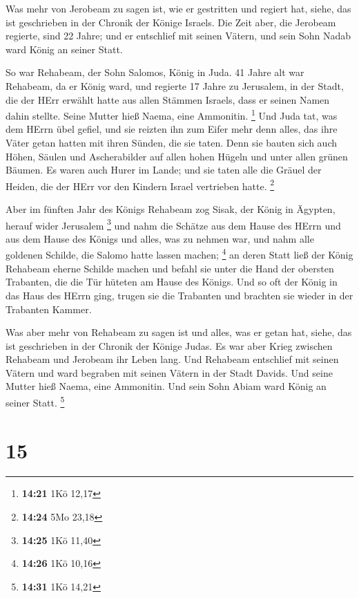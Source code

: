  Was mehr von Jerobeam zu sagen ist, wie er gestritten und
regiert hat, siehe, das ist geschrieben in der Chronik der Könige
Israels.  Die Zeit aber, die Jerobeam regierte, sind 22
Jahre; und er entschlief mit seinen Vätern, und sein Sohn Nadab ward
König an seiner Statt.

 So war Rehabeam, der Sohn Salomos, König in Juda. 41 Jahre
alt war Rehabeam, da er König ward, und regierte 17 Jahre zu Jerusalem,
in der Stadt, die der HErr erwählt hatte aus allen Stämmen Israels, dass
er seinen Namen dahin stellte. Seine Mutter hieß Naema, eine Ammonitin.
\footnote{\textbf{14:21} 1Kö 12,17}  Und Juda tat, was dem
HErrn übel gefiel, und sie reizten ihn zum Eifer mehr denn alles, das
ihre Väter getan hatten mit ihren Sünden, die sie taten. 
Denn sie bauten sich auch Höhen, Säulen und Ascherabilder auf allen
hohen Hügeln und unter allen grünen Bäumen.  Es waren auch
Hurer im Lande; und sie taten alle die Gräuel der Heiden, die der HErr
vor den Kindern Israel vertrieben hatte. \footnote{\textbf{14:24} 5Mo
  23,18}

 Aber im fünften Jahr des Königs Rehabeam zog Sisak, der
König in Ägypten, herauf wider Jerusalem \footnote{\textbf{14:25} 1Kö
  11,40}  und nahm die Schätze aus dem Hause des HErrn und
aus dem Hause des Königs und alles, was zu nehmen war, und nahm alle
goldenen Schilde, die Salomo hatte lassen machen; \footnote{\textbf{14:26}
  1Kö 10,16}  an deren Statt ließ der König Rehabeam eherne
Schilde machen und befahl sie unter die Hand der obersten Trabanten, die
die Tür hüteten am Hause des Königs.  Und so oft der König
in das Haus des HErrn ging, trugen sie die Trabanten und brachten sie
wieder in der Trabanten Kammer.

 Was aber mehr von Rehabeam zu sagen ist und alles, was er
getan hat, siehe, das ist geschrieben in der Chronik der Könige Judas.
 Es war aber Krieg zwischen Rehabeam und Jerobeam ihr Leben
lang.  Und Rehabeam entschlief mit seinen Vätern und ward
begraben mit seinen Vätern in der Stadt Davids. Und seine Mutter hieß
Naema, eine Ammonitin. Und sein Sohn Abiam ward König an seiner Statt.
\footnote{\textbf{14:31} 1Kö 14,21}

\hypertarget{section-4}{%
\section{15}\label{section-4}}

